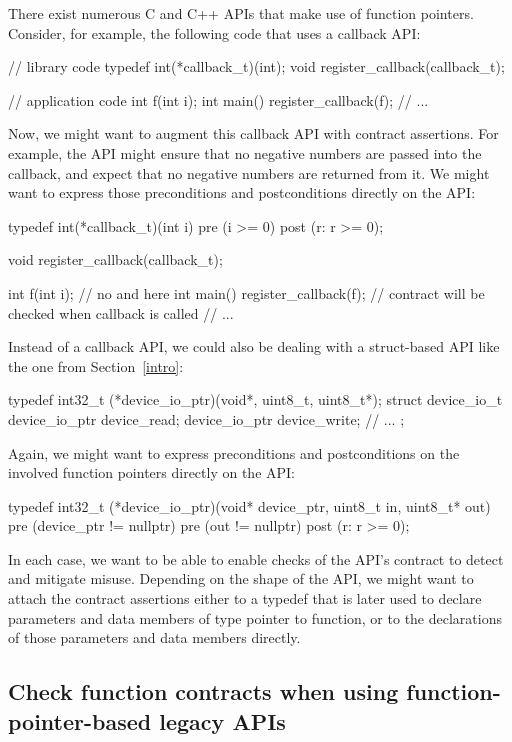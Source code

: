 There exist numerous C and C++ APIs that make use of function pointers. Consider, for example, the following code that uses a callback API:
\begin{codeblock}
// library code
typedef int(*callback_t)(int);
void register_callback(callback_t);

// application code
int f(int i); 
int main() {
  register_callback(f);
  // ...
}
\end{codeblock}
Now, we might want to augment this callback API with contract assertions. For example, the  API might ensure that no negative numbers are passed into the callback, and expect that no negative numbers are returned from it. We might want to express those preconditions and postconditions directly on the API:
\begin{codeblock}
typedef int(*callback_t)(int i) 
  pre (i >= 0) 
  post (r: r >= 0);
  
void register_callback(callback_t);
  
int f(int i);  // no  and  here
int main() {
  register_callback(f);  // contract will be checked when callback is called
  // ...
}
\end{codeblock}
Instead of a callback API, we could also be dealing with a struct-based API like the one from Section~\ref{intro}:
\begin{codeblock}
typedef int32_t (*device_io_ptr)(void*, uint8_t, uint8_t*);
struct device_io_t {
  device_io_ptr device_read;
  device_io_ptr device_write;
  // ...
};
\end{codeblock}
Again, we might want to express preconditions and postconditions on the involved function pointers directly on the API:
\begin{codeblock}
typedef int32_t (*device_io_ptr)(void* device_ptr, uint8_t in, uint8_t* out)
  pre (device_ptr != nullptr)
  pre (out != nullptr)
  post (r: r >= 0);
  
\end{codeblock}
In each case, we want to be able to enable checks of the API's contract to detect and mitigate misuse. Depending on the shape of the API, we might want to attach the contract assertions either to a typedef that is later used to declare parameters and data members of type pointer to function, or to the declarations of those parameters and data members directly.
\subsection{Check function contracts when using function-pointer-based legacy APIs}
\label{usecase_legacyapi}

